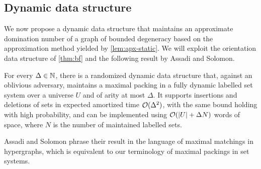\subsection{Dynamic data structure}

We now propose a dynamic data structure that maintains an approximate domination number of a graph of bounded degeneracy based on the approximation method yielded by \cref{lem:apx-static}. We will exploit the orientation data structure of \cref{thm:bf} and the following result by Assadi and Solomon.


\begin{theorem}\label{thm:AS}
	For every $\Delta\in \mathbb{N}$, there is a randomized dynamic data structure that, against an oblivious adversary, maintains a maximal packing in a fully dynamic labelled set system over a universe $U$ and of arity at most $\Delta$. It supports insertions and deletions of sets in expected amortized time $\mathcal{O}(\Delta^2)$, with the same bound holding with high probability, and can be implemented using $\mathcal{O}(|U|+\Delta N)$ words of space, where $N$ is the number of maintained labelled sets.
\end{theorem}

Assadi and Solomon phrase their result in the language of maximal matchings in hypergraphs, which is equivalent to our terminology of maximal packings in set systems. 

